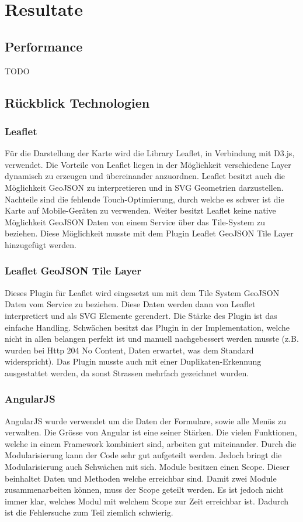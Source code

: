 \chapter{Resultate}
\section{Performance}
TODO
\section{Rückblick Technologien}
\subsection*{Leaflet}
Für die Darstellung der Karte wird die Library Leaflet, in Verbindung mit D3.js, verwendet. Die Vorteile von Leaflet liegen in der Möglichkeit verschiedene Layer dynamisch zu erzeugen und übereinander anzuordnen. Leaflet besitzt auch die Möglichkeit GeoJSON zu interpretieren und in SVG Geometrien darzustellen. Nachteile sind die fehlende Touch-Optimierung, durch welche es schwer ist die Karte auf Mobile-Geräten zu verwenden. Weiter besitzt Leaflet keine native Möglichkeit GeoJSON Daten von einem Service über das Tile-System zu beziehen. Diese Möglichkeit musste mit dem Plugin Leaflet GeoJSON Tile Layer hinzugefügt werden.
\subsection*{Leaflet GeoJSON Tile Layer}
Dieses Plugin für Leaflet wird eingesetzt um mit dem Tile System GeoJSON Daten vom Service zu beziehen. Diese Daten werden dann von Leaflet interpretiert und als SVG Elemente gerendert. Die Stärke des Plugin ist das einfache Handling. Schwächen besitzt das Plugin in der Implementation, welche nicht in allen belangen perfekt ist und manuell nachgebessert werden musste (z.B. wurden bei Http 204 No Content, Daten erwartet, was dem Standard widerspricht). Das Plugin musste auch mit einer Duplikaten-Erkennung ausgestattet werden, da sonst Strassen mehrfach gezeichnet wurden.
\subsection*{AngularJS}
AngularJS wurde verwendet um die Daten der Formulare, sowie alle Menüs zu verwalten. Die Grösse von Angular ist eine seiner Stärken. Die vielen Funktionen, welche in einem Framework kombiniert sind, arbeiten gut miteinander. Durch die Modularisierung kann der Code sehr gut aufgeteilt werden. Jedoch bringt die Modularisierung auch Schwächen mit sich. Module besitzen einen Scope. Dieser beinhaltet Daten und Methoden welche erreichbar sind. Damit zwei Module zusammenarbeiten können, muss der Scope geteilt werden. Es ist jedoch nicht immer klar, welches Modul mit welchem Scope zur Zeit erreichbar ist. Dadurch ist die Fehlersuche zum Teil ziemlich schwierig.
